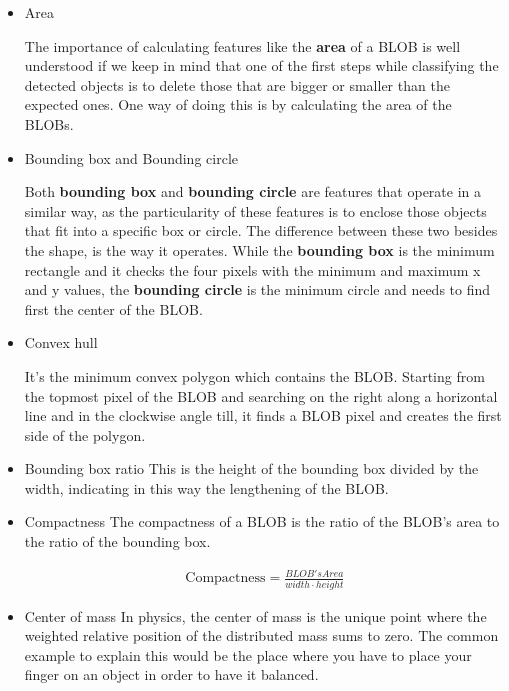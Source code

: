 \begin{itemize}
\item Area

The importance of calculating features like the \textbf{area} of a BLOB is well understood if we keep in mind that one of the first steps while classifying the detected objects is to delete those that are bigger or smaller than the expected ones. One way of doing this is by calculating the area of the BLOBs.

\item Bounding box and Bounding circle

Both \textbf{bounding box} and \textbf{bounding circle} are features that operate in a similar way, as the particularity of these features is to enclose those objects that fit into a specific box or circle. The difference between these two besides the shape, is the way it operates. While the \textbf{bounding box} is the minimum rectangle and it checks the four pixels with the minimum and maximum x and y values, the \textbf{bounding circle} is the minimum circle and needs to find first the center of the BLOB.

\item Convex hull

It's the minimum convex polygon which contains the BLOB. Starting from the topmost pixel of the BLOB and searching on the right along a horizontal line and in the clockwise angle till, it finds a BLOB pixel and creates the first side of the polygon.

\item Bounding box ratio
This is the height of the bounding box divided by the width, indicating in this way the lengthening of the BLOB.
\item Compactness
The compactness of a BLOB is the ratio of the BLOB's area to the ratio of the bounding box.

\begin{equation}
	\begin{aligned}
	\text{Compactness}=\displaystyle\frac{BLOB's Area}{width\cdot{height}}
	\label{Compact}
	\end{aligned}
\end{equation}


\item Center of mass
In physics, the center of mass is the unique point where the weighted relative position of the distributed mass sums to zero. The common example to explain this would be the place where you have to place your finger on an object in order to have it balanced.


\end{itemize}
